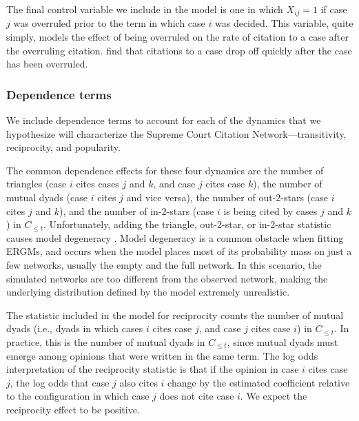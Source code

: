 \documentclass[headsepline=true, abstracton]{scrartcl}
\begin{document}
The final control variable we include in the model is one in which $X_{ij} = 1$ if case $j$ was overruled prior to the term in which case $i$ was decided. This variable, quite simply, models the effect of being overruled on the rate of citation to a case after the overruling citation. \citet{fowler2008authority} find that citations to a case drop off quickly after the case has been overruled.


\subsubsection{Dependence terms}\label{dependence_terms}

We include dependence terms to account for each of the dynamics that we hypothesize will characterize the Supreme Court Citation Network---transitivity, reciprocity, and popularity. %

The common dependence effects for these four dynamics are the number of triangles (case $i$ cites cases $j$ and $k$, and case $j$ cites case $k$), the number of mutual dyads (case $i$ cites $j$ and vice versa), the number of out-2-stars (case $i$ cites $j$ and $k$), and the number of in-2-stars (case $i$ is being cited by cases $j$ and $k$) in $C_{\leq t}$. Unfortunately, adding the triangle, out-2-star, or in-2-star statistic causes model degeneracy \citep{Handcock.2003}. Model degeneracy is a common obstacle when fitting ERGMs, and occurs when the model places most of its probability mass on just a few networks, usually the empty and the full network. In this scenario, the simulated networks are too different from the observed network, making the underlying distribution defined by the model extremely unrealistic.

The statistic included in the model for reciprocity counts the number of mutual dyads (i.e., dyads in which cases $i$ cites case $j$, and case $j$ cites case $i$) in $C_{\leq t}$. In practice, this is the number of mutual dyads in $C_{\leq t}$, since mutual dyads must emerge among opinions that were written in the same term. The log odds interpretation of the reciprocity statistic is that if the opinion in case $i$ cites case $j$, the log odds that case $j$ also cites $i$ change by the estimated coefficient relative to the configuration in which case $j$ does not cite case $i$. We expect the reciprocity effect to be positive.
\end{document}
